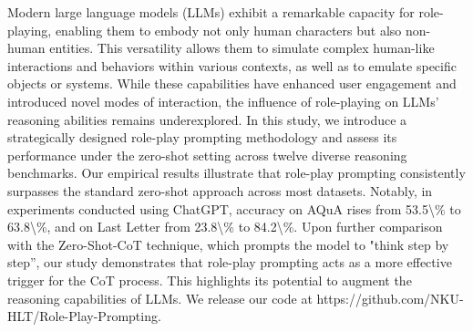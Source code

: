 Modern large language models (LLMs) exhibit a remarkable capacity for role-playing, enabling them to embody not only human characters but also non-human entities. This versatility allows them to simulate complex human-like interactions and behaviors within various contexts, as well as to emulate specific objects or systems. While these capabilities have enhanced user engagement and introduced novel modes of interaction, the influence of role-playing on LLMs' reasoning abilities remains underexplored. In this study, we introduce a strategically designed role-play prompting methodology and assess its performance under the zero-shot setting across twelve diverse reasoning benchmarks. Our empirical results illustrate that role-play prompting consistently surpasses the standard zero-shot approach across most datasets. Notably, in experiments conducted using ChatGPT, accuracy on AQuA rises from 53.5\textbackslash{}\% to 63.8\textbackslash{}\%, and on Last Letter from 23.8\textbackslash{}\% to 84.2\textbackslash{}\%. Upon further comparison with the Zero-Shot-CoT technique, which prompts the model to "think step by step'', our study demonstrates that role-play prompting acts as a more effective trigger for the CoT process. This highlights its potential to augment the reasoning capabilities of LLMs. We release our code at https://github.com/NKU-HLT/Role-Play-Prompting.